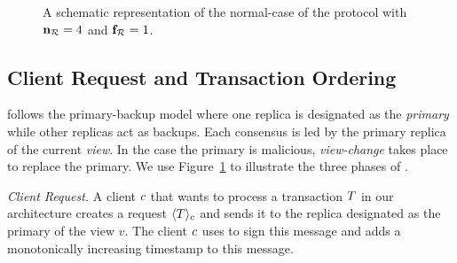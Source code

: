\begin{figure}[t]
   \caption{A schematic representation of the normal-case of the \pbft{} 
   protocol with $\mathbf{n}_{\mathcal{R}{}} = 4$ and $\mathbf{f}_{\mathcal{R}} = 1$. 
	}
   \label{fig:pbft}
\end{figure}


\subsection{Client Request and Transaction Ordering}
\pbft{} follows the primary-backup model where one replica is designated as the 
{\em primary} while other replicas act as backups. Each consensus is led by the 
primary replica of the current {\em view}. In the case the primary is malicious, 
{\em view-change} takes place to replace the primary. We use Figure~\ref{fig:pbft} 
to illustrate the three phases of \pbft{}.


{\em Client Request.}
A client $\Client{}$ that wants to process a transaction $\Transaction{}$ in 
our \DualChain{} architecture creates a request $\SignMessage{\Transaction}{\Client{}}$ 
and sends it to the replica designated as the primary of the view $v$. The 
client $\Client{}$ uses \DS{} to sign this message and 
adds a monotonically increasing timestamp to this message.


